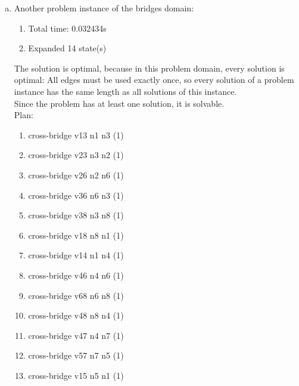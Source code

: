 \documentclass{article} %
\begin{document}
\begin{enumerate}[(a)]
\begin{enumerate}[]
        \item cross-bridge gruene-bruecke vorstadt kneiphof (1)
        \item cross-bridge schmiedebruecke kneiphof altstadt (1)
        \item cross-bridge holzbruecke altstadt lomse (1)
        \item cross-bridge honigbruecke lomse kneiphof (1)
        \item cross-bridge gruene-bruecke kneiphof vorstadt (1)
        \item cross-bridge hohe-bruecke vorstadt lomse (1)
        \item cross-bridge holzbruecke lomse altstadt (1)
        \item cross-bridge kraemerbruecke altstadt kneiphof (1)
    \end{enumerate}
    \item Another problem instance of the bridges domain:
     \begin{enumerate}[]
        \item Total time: 0.032434s
        \item Expanded 14 state(s)
     \end{enumerate}
    The solution is optimal, because in this problem domain,
    every solution is optimal: All edges must be
    used exactly once, so every solution of a problem
    instance has the same length as all solutions of
    this instance.\\
    Since the problem has at least one solution, it is
    solvable.\\
    Plan:
    \begin{enumerate}[]
        \item cross-bridge v13 n1 n3 (1)
        \item cross-bridge v23 n3 n2 (1)
        \item cross-bridge v26 n2 n6 (1)
        \item cross-bridge v36 n6 n3 (1)
        \item cross-bridge v38 n3 n8 (1)
        \item cross-bridge v18 n8 n1 (1)
        \item cross-bridge v14 n1 n4 (1)
        \item cross-bridge v46 n4 n6 (1)
        \item cross-bridge v68 n6 n8 (1)
        \item cross-bridge v48 n8 n4 (1)
        \item cross-bridge v47 n4 n7 (1)
        \item cross-bridge v57 n7 n5 (1)
        \item cross-bridge v15 n5 n1 (1)
    \end{enumerate}
\end{enumerate}
\end{document}
